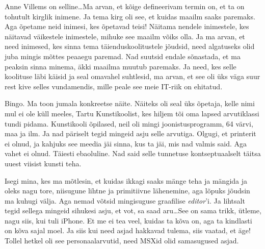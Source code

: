 Anne Villems on selline\ldots  Ma arvan, et kõige defineerivam termin on, et ta 
on tohutult kirglik inimene. Ja tema kirg oli see, et kuidas maailm saaks 
paremaks. Aga  õpetame neid inimesi, kes õpetavad teisi! Näitama nendele 
inimestele, kes näitavad väikestele inimestele, mihuke see maailm võiks olla. 
Ja ma arvan, et need inimesed, kes sinna tema täienduskoolitustele jõudsid, 
need algatuseks olid juba mingis mõttes peaaegu paremad. Nad suutsid endale  
sõnastada, et ma peaksin sinna minema, äkki maailma muutub paremaks. Ja need, 
kes selle koolituse läbi käisid ja seal  omavahel suhtlesid, ma arvan, et see 
oli  üks väga suur rest kive selles vundamendis, mille peale see meie IT-riik on 
ehitatud.


Bingo. Ma toon jumala konkreetse näite. Näiteks oli  seal 
üks õpetaja, kelle nimi mul ei ole küll meeles,  Tartu 
Kunstikoolist, kes hiljem tõi oma lapsed 
arvutiklassi tundi pidama. Kunstikooli õpilased, neil oli mingi 
joonistusprogramm, 64 värvi, maa ja ilm. Ja nad päriselt tegid mingeid asju 
selle arvutiga. Olgugi, et printerit ei olnud, ja kahjuks see meedia jäi sinna, 
kus ta jäi,  mis nad valmis said. Aga vahet ei olnud. Täiesti ebaoluline.  
Nad said selle tunnetuse kontseptuaalselt täitsa uuest viisist kunsti teha. 

Isegi mina, kes ma mõtlesin, et kuidas ikkagi saaks mänge teha ja 
mängida ja  oleks nagu tore, niisugune lihtne ja primitiivne lähenemine, aga 
lõpuks jõudsin ma kuhugi välja. Aga nemad võtsid  
mingisuguse graafilise \emph{editor}'i. Ja lihtsalt tegid sellega mingeid 
sihukesi asju, et vot, sa saad aru\ldots See on sama trikk, ütleme, nagu siis, 
kui tuli iPhone. Et me ei tea veel, kuidas ta kõva on, aga ta kindlasti on kõva 
sajal moel. Ja siis kui need asjad hakkavad tulema, siis vaatad, et äge! Tollel 
hetkel oli see personaalarvutid, need MSXid olid samasugused asjad.



